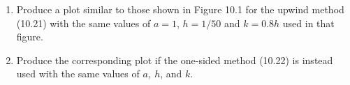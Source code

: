 


\begin{enumerate} 
\item
Produce a plot similar to those shown in Figure 10.1 for the upwind method
(10.21) with the same values of $a=1$, $h=1/50$ and $k=0.8h$
used in that figure.

\item Produce the corresponding plot if the one-sided method (10.22) is
instead used with the same values of $a,~h$, and $k$.
\end{enumerate}

